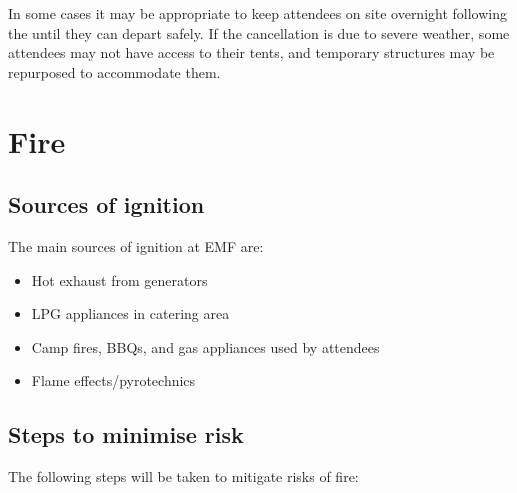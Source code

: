 In some cases it may be appropriate to keep attendees on site overnight following the
until they can depart safely. If the cancellation is due to severe weather, some
attendees may not have access to their tents, and temporary structures may be repurposed
to accommodate them.

\section{Fire}
\label{fire}
\subsection{Sources of ignition}

The main sources of ignition at EMF are:

\begin{itemize}
\item Hot exhaust from generators
\item LPG appliances in catering area
\item Camp fires, BBQs, and gas appliances used by attendees
\item Flame effects/pyrotechnics
\end{itemize}

\subsection{Steps to minimise risk}
The following steps will be taken to mitigate risks of fire:

